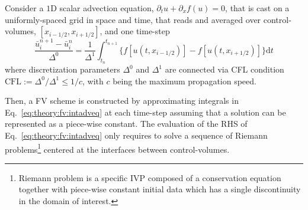 Consider a $1$D scalar advection equation, 
$\partial_t u + \partial_x f(u) = 0$, 
that is cast on a uniformly-spaced grid in space and time, that reads 
and averaged over control-volumes, $[x_{i-1/2},x_{i+1/2}]$, 
%
and one time-step 
%
\begin{equation}
    \frac{\bar{u}_{i}^{n+1}-\bar{u}_{i}^{n}}{\Delta^0} = \frac{1}{\Delta^1}\int_{t_n}^{t_{n+1}}\big\{f[u(t,x_{i-1/2})] - f[u(t,x_{i+1/2})]\big\}\text{d}t
    \label{eq:theory:fv:intadveq}
\end{equation}
where discretization parameters $\Delta^0$ and $\Delta^1$ are connected via \ac{CFL} 
condition $ \text{CFL}:= \Delta^0 / \Delta^1 \leq 1/c$, with $c$ being the 
maximum propagation speed.

Then, a \ac{FV} scheme is constructed by approximating integrals in 
Eq.~\eqref{eq:theory:fv:intadveq} at each time-step 
assuming that a solution can be represented as a piece-wise constant.
%
The evaluation of the \ac{RHS} of Eq.~\eqref{eq:theory:fv:intadveq} only requires to solve a sequence of Riemann problems\footnote{
    Riemann problem is a specific \ac{IVP} composed of a conservation equation together with piece-wise constant initial data which has a single discontinuity in the domain of interest. 
} centered at the interfaces between control-volumes.


